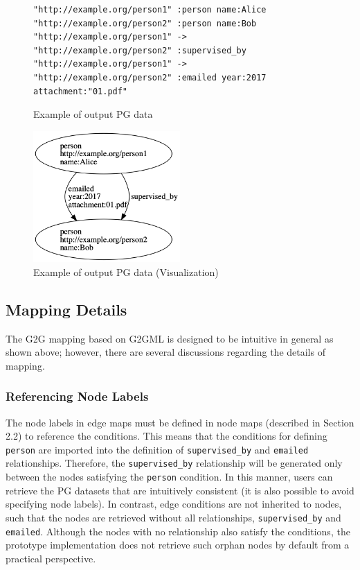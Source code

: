 \documentclass[runningheads]{llncs}
\begin{document}
\begin{figure}[!t]
\begin{scriptsize}
\begin{verbatim}
"http://example.org/person1" :person name:Alice
"http://example.org/person2" :person name:Bob
"http://example.org/person1" -> "http://example.org/person2" :supervised_by
"http://example.org/person1" -> "http://example.org/person2" :emailed year:2017 attachment:"01.pdf"
\end{verbatim}
\end{scriptsize}
\caption{Example of output PG data}
\label{fig:example-pg}
\end{figure}


\begin{figure}
\center
\includegraphics[width=0.5\textwidth]{pg_example5.png}
\caption{Example of output PG data (Visualization)}
\label{fig:pg_example5}
\end{figure}

\subsection{Mapping Details}
\label{subsec:mapping-details}
The G2G mapping based on G2GML is designed to be intuitive in general as shown above; however, there are several discussions regarding the details of mapping.

\subsubsection{Referencing Node Labels}
The node labels in edge maps must be defined in node maps (described in Section 2.2) to reference the conditions. This means that the conditions for defining \texttt{person} are imported into the definition of \texttt{supervised\_by} and \texttt{emailed} relationships. Therefore, the \texttt{supervised\_by} relationship will be generated only between the nodes satisfying the \texttt{person} condition. In this manner, users can retrieve the PG datasets that are intuitively consistent (it is also possible to avoid specifying node labels). In contrast, edge conditions are not inherited to nodes, such that the nodes are retrieved without all relationships, \texttt{supervised\_by} and \texttt{emailed}. Although the nodes with no relationship also satisfy the conditions, the prototype implementation does not retrieve such orphan nodes by default from a practical perspective.
\end{document}
